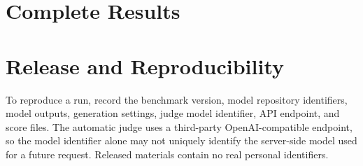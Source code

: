 \clearpage
\section{Complete Results}
\label{sec:supp-results}
\suppressfloats[t]



\FloatBarrier

\section{Release and Reproducibility}
\label{sec:supp-release}

To reproduce a run, record the benchmark version, model repository identifiers, model outputs, generation settings, judge model identifier, API endpoint, and score files. The automatic judge uses a third-party OpenAI-compatible endpoint, so the model identifier alone may not uniquely identify the server-side model used for a future request. Released materials contain no real personal identifiers.
